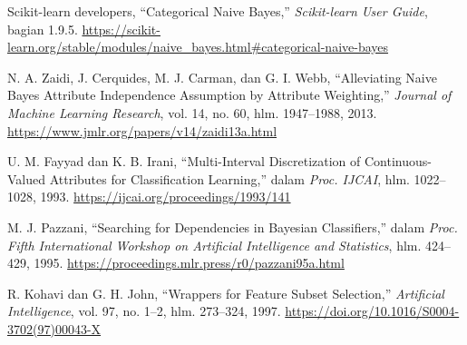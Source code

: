  Scikit-learn developers, “Categorical Naive Bayes,” \emph{Scikit-learn User Guide}, bagian 1.9.5. \url{https://scikit-learn.org/stable/modules/naive_bayes.html#categorical-naive-bayes}

 N. A. Zaidi, J. Cerquides, M. J. Carman, dan G. I. Webb, “Alleviating Naive Bayes Attribute Independence Assumption by Attribute Weighting,” \emph{Journal of Machine Learning Research}, vol. 14, no. 60, hlm. 1947--1988, 2013. \url{https://www.jmlr.org/papers/v14/zaidi13a.html}

 U. M. Fayyad dan K. B. Irani, “Multi-Interval Discretization of Continuous-Valued Attributes for Classification Learning,” dalam \emph{Proc. IJCAI}, hlm. 1022--1028, 1993. \url{https://ijcai.org/proceedings/1993/141}

 M. J. Pazzani, “Searching for Dependencies in Bayesian Classifiers,” dalam \emph{Proc. Fifth International Workshop on Artificial Intelligence and Statistics}, hlm. 424--429, 1995. \url{https://proceedings.mlr.press/r0/pazzani95a.html}

 R. Kohavi dan G. H. John, “Wrappers for Feature Subset Selection,” \emph{Artificial Intelligence}, vol. 97, no. 1--2, hlm. 273--324, 1997. \url{https://doi.org/10.1016/S0004-3702(97)00043-X}

